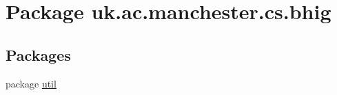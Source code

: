 \hypertarget{namespaceuk_1_1ac_1_1manchester_1_1cs_1_1bhig}{\section{Package uk.\-ac.\-manchester.\-cs.\-bhig}
\label{namespaceuk_1_1ac_1_1manchester_1_1cs_1_1bhig}
}
\subsection*{Packages}
\begin{DoxyCompactItemize}
\item 
package \hyperlink{namespaceuk_1_1ac_1_1manchester_1_1cs_1_1bhig_1_1util}{util}
\end{DoxyCompactItemize}
